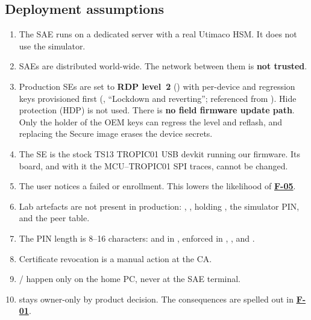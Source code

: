 \documentclass[11pt,a4paper]{article}
\newcommand{\fid}[1]{\textbf{#1}}
\begin{document}
\subsection{Deployment assumptions}
\begin{enumerate}
\item The SAE runs on a dedicated server with a real Utimaco HSM. It does not use the simulator.
\item SAEs are distributed world-wide. The network between them is \textbf{not trusted}.
\item Production SEs are set to \textbf{RDP level~2} () with per-device  and  regression keys provisioned first (, ``Lockdown and reverting''; referenced from ). Hide protection (HDP) is not used. There is \textbf{no field firmware update path}. Only the holder of the OEM keys can regress the level and reflash, and replacing the Secure image erases the device secrets.
\item The SE is the stock TS13 TROPIC01 USB devkit running our firmware. Its board, and with it the MCU--TROPIC01 SPI traces, cannot be changed.
\item The user notices a failed  or enrollment. This lowers the likelihood of \hyperref[f:F-05]{\fid{F-05}}.
\item Lab artefacts are not present in production: , ,  holding , the simulator PIN, and the  peer table.
\item The PIN length is 8--16 characters:  and  in , enforced in , , and .
\item Certificate revocation is a manual action at the CA.
\item {}/ happen only on the home PC, never at the SAE terminal.
\item {} stays owner-only by product decision. The consequences are spelled out in \hyperref[f:F-01]{\fid{F-01}}.
\end{enumerate}
\end{document}
